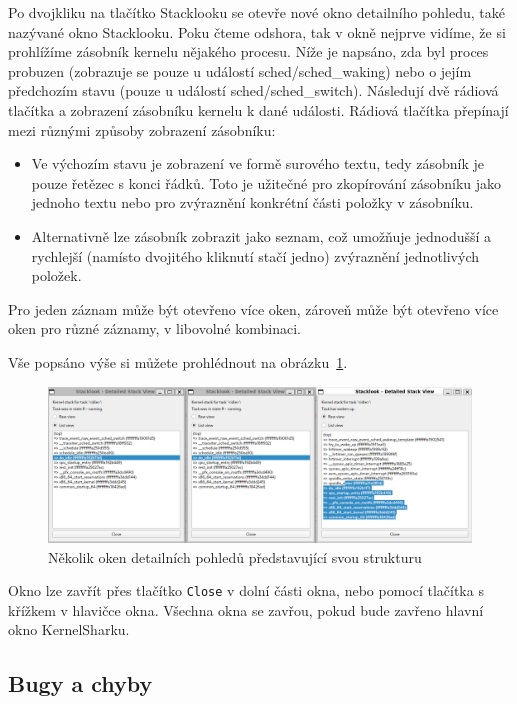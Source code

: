 Po dvojkliku na tlačítko Stacklooku se otevře nové okno detailního pohledu, také nazývané okno Stacklooku. Poku čteme odshora, tak v okně nejprve vidíme, že si prohlížíme zásobník kernelu nějakého procesu. Níže je napsáno, zda byl proces probuzen (zobrazuje se pouze u událostí sched/sched\_waking) nebo o jejím předchozím stavu (pouze u událostí sched/sched\_switch). Následují dvě rádiová tlačítka a zobrazení zásobníku kernelu k dané události. Rádiová tlačítka přepínají mezi různými způsoby zobrazení zásobníku:
\begin{itemize}
  \item Ve výchozím stavu je zobrazení ve formě surového textu, tedy zásobník je pouze řetězec s konci řádků. Toto je užitečné pro zkopírování zásobníku jako jednoho textu nebo pro zvýraznění konkrétní části položky v zásobníku.
  \item Alternativně lze zásobník zobrazit jako seznam, což umožňuje jednodušší a rychlejší (namísto dvojitého kliknutí stačí jedno) zvýraznění jednotlivých položek.
\end{itemize}

Pro jeden záznam může být otevřeno více oken, zároveň může být otevřeno více oken pro různé záznamy, v libovolné kombinaci.

Vše popsáno výše si můžete prohlédnout na obrázku~\ref{SlMultipleWindowsMultipleViewsTwoSameEntires}.

\begin{figure}[p]\centering
    \includegraphics[width=140mm]{img/Stacklook/SlMultipleWindowsMultipleViewsTwoSameEntires}
    \caption{Několik oken detailních pohledů představující svou strukturu}
    \label{SlMultipleWindowsMultipleViewsTwoSameEntires}
\end{figure}

Okno lze zavřít přes tlačítko \texttt{Close} v dolní části okna, nebo pomocí tlačítka s křížkem v hlavičce okna. Všechna okna se zavřou, pokud bude zavřeno hlavní okno KernelSharku. 

\subsection{Bugy a chyby}

